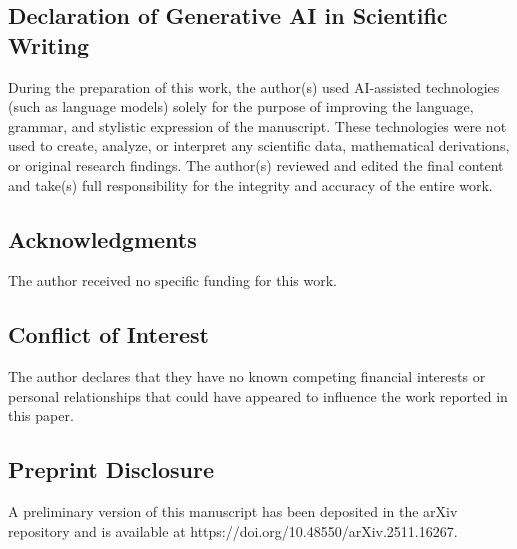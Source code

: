 \documentclass [reqno]{amsart}
\theoremstyle{plain}
\numberwithin{equation}{section}
\begin{document}
\subsection*{Declaration of Generative AI in Scientific Writing}
During the preparation of this work, the author(s) used AI-assisted technologies (such as language models) solely for the purpose of improving the language, grammar, and stylistic expression of the manuscript. These technologies were not used to create, analyze, or interpret any scientific data, mathematical derivations, or original research findings. The author(s) reviewed and edited the final content and take(s) full responsibility for the integrity and accuracy of the entire work.

\subsection*{Acknowledgments}
The author received no specific funding for this work.

\subsection*{Conflict of Interest}
The author declares that they have no known competing financial interests or personal relationships that could have appeared to influence the work reported in this paper.

\subsection*{Preprint Disclosure}
A preliminary version of this manuscript has been deposited in the arXiv repository and is available at {https://doi.org/10.48550/arXiv.2511.16267}.
\end{document}
